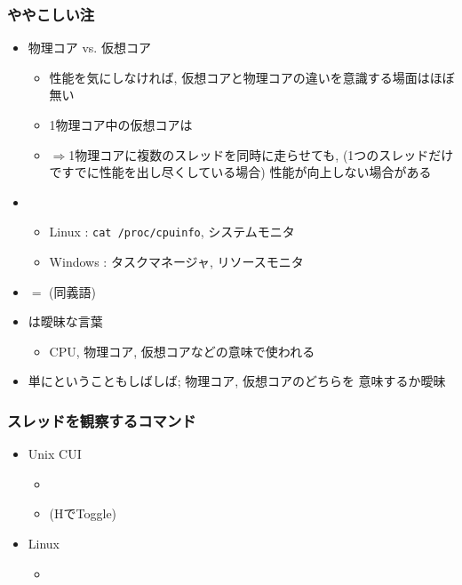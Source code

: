 \documentclass[12pt,dvipdfmx]{beamer}
\begin{document}
\begin{frame}
  \frametitle{ややこしい注}
\begin{itemize}
\item 物理コア vs. 仮想コア
  \begin{itemize}
  \item 性能を気にしなければ,
    仮想コアと物理コアの違いを意識する場面はほぼ無い
  \item 1物理コア中の仮想コアは
  \item $\Rightarrow$1物理コアに複数のスレッドを同時に走らせても,
    (1つのスレッドだけですでに性能を出し尽くしている場合)
    性能が向上しない場合がある
  \end{itemize}
  
\item {}
  \begin{itemize}
  \item Linux : {\tt cat /proc/cpuinfo}, システムモニタ
  \item Windows : タスクマネージャ, リソースモニタ
  \end{itemize}
\item {} $=$  (同義語)
\item {}は曖昧な言葉
  \begin{itemize}
  \item CPU, 物理コア, 仮想コアなどの意味で使われる
  \end{itemize}
\item 単にということもしばしば; 物理コア, 仮想コアのどちらを
  意味するか曖昧
\end{itemize}
\end{frame}

\begin{frame}
\frametitle{スレッドを観察するコマンド}
\begin{itemize}
\item Unix CUI
  \begin{itemize}
  \item {}
  \item {} (HでToggle)
  \end{itemize}
\item Linux
  \begin{itemize}
  \item {}
  \end{itemize}
\end{itemize}
\end{frame}
\end{document}
